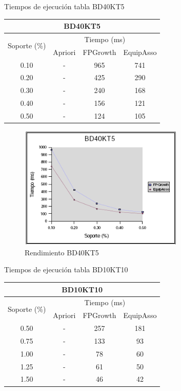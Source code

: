 \begin{table}[h]
\caption{Tiempos de ejecuci\'on tabla BD40KT5}
\end{table}
\begin{center}
\begin{tabular}{|*{4}{c|}} \hline
\multicolumn{4}{|c|}{\textbf{BD40KT5}}\\ \hline\hline
\multirow{2}{*}{Soporte (\%)} & \multicolumn{3}{|c|}{Tiempo (ms)}\\ \cline{2-4}
     & Apriori & FPGrowth & EquipAsso\\ \hline
0.10 & - & 965 & 741\\ \hline
0.20 & - & 425 & 290\\ \hline
0.30 & - & 240 & 168\\ \hline
0.40 & - & 156 & 121\\ \hline
0.50 & - & 124 & 105\\ \hline
\end{tabular}
\end{center}

\begin{figure}[h]
\centering
\includegraphics[width=0.7\textwidth]{images/bd40kt52.png}
\caption{Rendimiento BD40KT5}
\label{40k2}
\end{figure}

\newpage

\begin{table}[h]
\caption{Tiempos de ejecuci\'on tabla BD10KT10}
\end{table}
\begin{center}
\begin{tabular}{|*{4}{c|}} \hline
\multicolumn{4}{|c|}{\textbf{BD10KT10}}\\ \hline\hline
\multirow{2}{*}{Soporte (\%)} & \multicolumn{3}{|c|}{Tiempo (ms)}\\ \cline{2-4}
     & Apriori & FPGrowth & EquipAsso\\ \hline
0.50 & - & 257 & 181\\ \hline
0.75 & - & 133 & 93\\ \hline
1.00 & - &  78 & 60\\ \hline
1.25 & - &  61 & 50\\ \hline
1.50 & - &  46 & 42\\ \hline
\end{tabular}
\end{center}

